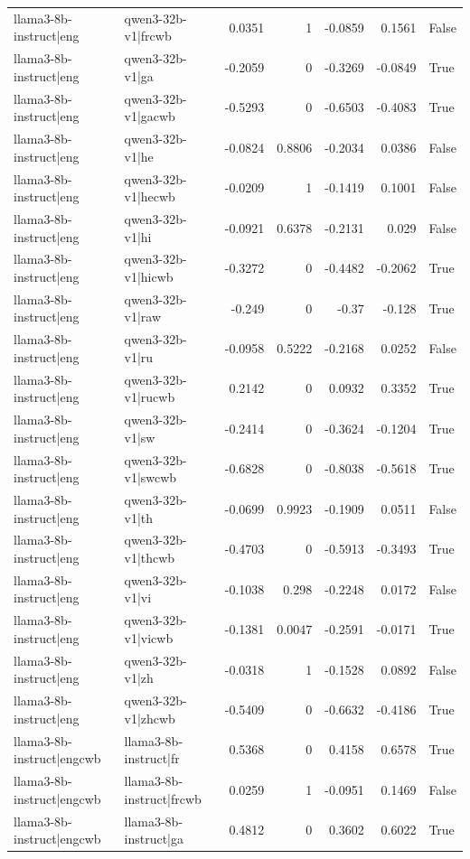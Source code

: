 \begin{table}
\begin{tabular}{l l r r r r l}
llama3-8b-instruct|eng & qwen3-32b-v1|frcwb & 0.0351 & 1 & -0.0859 & 0.1561 & False \\
llama3-8b-instruct|eng & qwen3-32b-v1|ga & -0.2059 & 0 & -0.3269 & -0.0849 & True \\
llama3-8b-instruct|eng & qwen3-32b-v1|gacwb & -0.5293 & 0 & -0.6503 & -0.4083 & True \\
llama3-8b-instruct|eng & qwen3-32b-v1|he & -0.0824 & 0.8806 & -0.2034 & 0.0386 & False \\
llama3-8b-instruct|eng & qwen3-32b-v1|hecwb & -0.0209 & 1 & -0.1419 & 0.1001 & False \\
llama3-8b-instruct|eng & qwen3-32b-v1|hi & -0.0921 & 0.6378 & -0.2131 & 0.029 & False \\
llama3-8b-instruct|eng & qwen3-32b-v1|hicwb & -0.3272 & 0 & -0.4482 & -0.2062 & True \\
llama3-8b-instruct|eng & qwen3-32b-v1|raw & -0.249 & 0 & -0.37 & -0.128 & True \\
llama3-8b-instruct|eng & qwen3-32b-v1|ru & -0.0958 & 0.5222 & -0.2168 & 0.0252 & False \\
llama3-8b-instruct|eng & qwen3-32b-v1|rucwb & 0.2142 & 0 & 0.0932 & 0.3352 & True \\
llama3-8b-instruct|eng & qwen3-32b-v1|sw & -0.2414 & 0 & -0.3624 & -0.1204 & True \\
llama3-8b-instruct|eng & qwen3-32b-v1|swcwb & -0.6828 & 0 & -0.8038 & -0.5618 & True \\
llama3-8b-instruct|eng & qwen3-32b-v1|th & -0.0699 & 0.9923 & -0.1909 & 0.0511 & False \\
llama3-8b-instruct|eng & qwen3-32b-v1|thcwb & -0.4703 & 0 & -0.5913 & -0.3493 & True \\
llama3-8b-instruct|eng & qwen3-32b-v1|vi & -0.1038 & 0.298 & -0.2248 & 0.0172 & False \\
llama3-8b-instruct|eng & qwen3-32b-v1|vicwb & -0.1381 & 0.0047 & -0.2591 & -0.0171 & True \\
llama3-8b-instruct|eng & qwen3-32b-v1|zh & -0.0318 & 1 & -0.1528 & 0.0892 & False \\
llama3-8b-instruct|eng & qwen3-32b-v1|zhcwb & -0.5409 & 0 & -0.6632 & -0.4186 & True \\
llama3-8b-instruct|engcwb & llama3-8b-instruct|fr & 0.5368 & 0 & 0.4158 & 0.6578 & True \\
llama3-8b-instruct|engcwb & llama3-8b-instruct|frcwb & 0.0259 & 1 & -0.0951 & 0.1469 & False \\
llama3-8b-instruct|engcwb & llama3-8b-instruct|ga & 0.4812 & 0 & 0.3602 & 0.6022 & True \\

\end{tabular}
\end{table}
